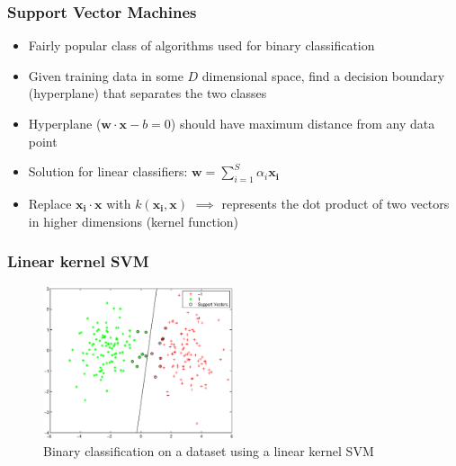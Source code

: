 \documentclass[xcolor=table]{beamer}
\begin{document}
    \begin{frame}
        \frametitle{Support Vector Machines}
        \begin{itemize}
            \item{Fairly popular class of algorithms used for binary classification}
            \item{Given training data in some $D$ dimensional space, find a decision boundary (hyperplane) that separates the two classes}
            \pause
            \item{Hyperplane ($\mathbf{w} \cdot \mathbf{x} - b = 0$) should have maximum distance from any data point}
            \item{Solution for linear classifiers: $\mathbf{w} = \displaystyle \sum_{i = 1}^{S} \alpha_i\mathbf{x_i}$}
            \pause
            \item{Replace $\mathbf{x_i} \cdot \mathbf{x}$ with $k(\mathbf{x_i}, \mathbf{x})$ $\implies$ represents the dot product of two vectors in higher dimensions (kernel function)}
        \end{itemize}
    \end{frame}
    
    \begin{frame}
        \frametitle{Linear kernel SVM}
        \begin{figure}
            \centering
            \includegraphics[width=0.5\textwidth]{figures/svm_linear_classification.eps}
            \caption{Binary classification on a dataset using a linear kernel SVM}
        \end{figure}
    \end{frame}
    
\end{document}
